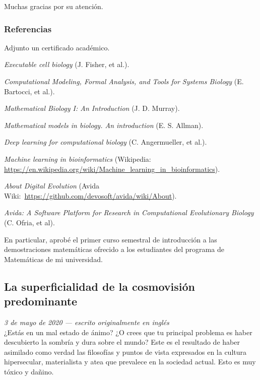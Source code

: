 \documentclass[12pt]{article}
\begin{document}
	Muchas gracias por su atención.

	\subsubsection*{Referencias}

	\begin{enumerate}[label={[\arabic*]}]
	\item Adjunto un certificado académico.
	\item \textit{Executable cell biology} (J. Fisher, et al.).
	\item \textit{Computational Modeling, Formal Analysis, and Tools for
		Systems Biology} (E. Bartocci, et al.).
	\item \textit{Mathematical Biology I: An Introduction} (J. D. Murray).
	\item \textit{Mathematical models in biology. An introduction}
		(E. S. Allman).
	\item \textit{Deep learning for computational biology}
		(C. Angermueller, et al.).
	\item \textit{Machine learning in bioinformatics} (Wikipedia:
	\url{https://en.wikipedia.org/wiki/Machine_learning_in_bioinformatics}).
\item \textit{About Digital Evolution} (Avida Wiki:\ 
	\url{https://github.com/devosoft/avida/wiki/About}).
	\item \textit{Avida: A Software Platform for Research in Computational
		Evolutionary Biology} (C. Ofria, et al).
	\item En particular, aprobé el primer curso semestral de introducción a
		las demostraciones matemáticas ofrecido a los estudiantes del
		programa de Matemáticas de mi universidad.
	\end{enumerate}

	\newpage

	\subsection{La superficialidad de la cosmovisión predominante}
	\setcounter{footnote}{0}

	\textit{3 de mayo de 2020 --- escrito originalmente en inglés}\\

	¿Estás en un mal estado de ánimo? ¿O crees que tu principal problema es
	haber descubierto la sombría y dura \textquote{verdad} sobre el mundo?
	Este es el resultado de haber asimilado como verdad las filosofías y
	puntos de vista expresados en la cultura hipersecular, materialista y
	atea que prevalece en la sociedad actual. Esto es muy tóxico y dañino.
\end{document}
